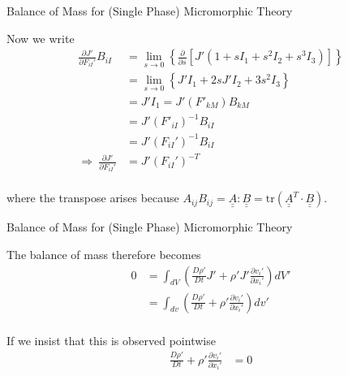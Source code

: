\documentclass[11pt]{beamer}
\newcommand{\TEN}[1]{\underline{\underline{#1}}}
\begin{document}
\begin{frame}{Balance of Mass for (Single Phase) Micromorphic Theory}

Now we write
\begin{align*}
\frac{\partial J'}{\partial F_{iI}'}B_{iI} &= \lim_{s \to 0} \left\{\frac{\partial}{\partial s}\left[ J' \left(1 + sI_1 + s^2 I_2 + s^3 I_3\right)\right]\right\}\\
&= \lim_{s \to 0} \left\{J' I_1 + 2 s J' I_2 + 3 s^2 I_3\right\}\\
&= J' I_1 = J' \left(F'_{kM}\right)B_{kM}\\
&= J' \left(F'_{iI} \right)^{-1} B_{iI}\\
&= J' \left(F_{iI}'\right)^{-1} B_{iI}\\
\Rightarrow\ \frac{\partial J'}{\partial F_{iI}'} &= J' \left(F_{iI}'\right)^{-T}\\
\end{align*}

where the transpose arises because $A_{ij} B_{ij} = \TEN{A}:\TEN{B} = \text{tr}\left(\TEN{A}^{T} \cdot \TEN{B}\right)$.

\end{frame}

\begin{frame}{Balance of Mass for (Single Phase) Micromorphic Theory}

The balance of mass therefore becomes
\begin{align*}
0 &= \int_{dV} \left(\frac{D \rho'}{Dt} J' + \rho' J' \frac{\partial v_i'}{\partial x_i'}\right) dV'\\
&= \int_{dv} \left(\frac{D \rho'}{Dt} + \rho' \frac{\partial v_i'}{\partial x_i'}\right) dv'\\
\end{align*}

If we insist that this is observed pointwise
\begin{align*}
\frac{D \rho'}{Dt} + \rho' \frac{\partial v_i'}{\partial x_i'} &= 0\\
\end{align*}

\end{frame}
\end{document}
